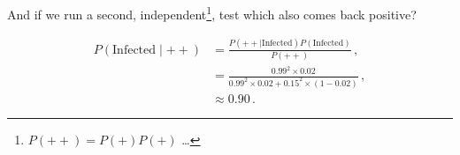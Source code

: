 \noindent And if we run a second, independent\footnote{$P\left(++\right) = P\left(+\right)P\left(+\right)$ \ldots}, test which also comes back positive?

\begin{equation}\label{eq:stats:BayesEx2}
\begin{split}
P\left(\text{Infected} \mid ++\right) &= \frac{P\left(++ \mid \text{Infected}\right) P\left(\text{Infected}\right)}{P\left(++\right)}\,, \\
&= \frac{\num{0.99}^{2} \times \num{0.02}}{\num{0.99}^{2} \times \num{0.02} + \num{0.15}^{2} \times \left(1-\num{0.02}\right)}\,, \\
&\approx \num{0.90}\,.
\end{split}
\end{equation}








